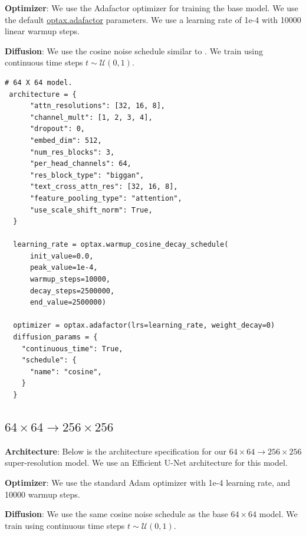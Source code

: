 \textbf{Optimizer}: We use the Adafactor optimizer for training the base model. We use the default \href{https://optax.readthedocs.io/en/latest/api.html#adafactor}{optax.adafactor} parameters. We use a learning rate of 1e-4 with 10000 linear warmup steps.

\textbf{Diffusion}: We use the cosine noise schedule similar to \cite{nichol2021improved}. We train using continuous time steps $t \sim \mathcal{U}(0, 1)$.
\begin{Verbatim}[fontsize=\scriptsize]
 # 64 X 64 model.
 architecture = {
      "attn_resolutions": [32, 16, 8],
      "channel_mult": [1, 2, 3, 4],
      "dropout": 0,
      "embed_dim": 512,
      "num_res_blocks": 3,
      "per_head_channels": 64,
      "res_block_type": "biggan",
      "text_cross_attn_res": [32, 16, 8],
      "feature_pooling_type": "attention",
      "use_scale_shift_norm": True,
  }

  learning_rate = optax.warmup_cosine_decay_schedule(
      init_value=0.0,
      peak_value=1e-4,
      warmup_steps=10000,
      decay_steps=2500000,
      end_value=2500000)

  optimizer = optax.adafactor(lrs=learning_rate, weight_decay=0)
  diffusion_params = {
    "continuous_time": True,
    "schedule": {
      "name": "cosine",
    }
  }
\end{Verbatim}

\subsection{$64\times64 \rightarrow 256\times256$}
\textbf{Architecture}: Below is the architecture specification for our $64\times64 \rightarrow 256\times256$ super-resolution model. We use an Efficient U-Net architecture for this model.

\textbf{Optimizer}: We use the standard Adam optimizer with 1e-4 learning rate, and 10000 warmup steps.

\textbf{Diffusion}: We use the same cosine noise schedule as the base $64\times64$ model. We train using continuous time steps $t \sim \mathcal{U}(0, 1)$.

